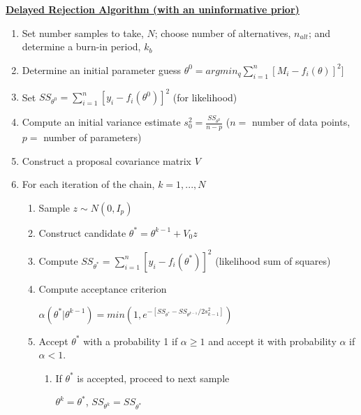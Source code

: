 \begin{tcolorbox} \label{alg:DRmcmc}
\textbf{\underline{Delayed Rejection Algorithm (with an uninformative prior)}}
\begin{enumerate}

\item Set number samples to take, $N$; choose number of alternatives, $n_{alt}$; and determine a burn-in period, $k_b$
    \item Determine an initial parameter guess $\theta^0 = argmin_q \sum_{i=1}^{n}[M_i - f_i(\theta)]^2]$
    \item Set $SS_{\theta^0} = \sum_{i = 1}^{n}[y_i - f_i(\theta^0)]^2$ (for likelihood)
    \item Compute an initial variance estimate $s_0^2 = \frac{SS_{\theta^0}}{n-p}$ ($n =$ number of data points, $p = $ number of parameters)
    \item Construct a proposal covariance matrix $V$ 
    \item For each iteration of the chain, $k = 1,...,N$
    \begin{enumerate}
        \item Sample $z \sim N(0,I_p)$ 
        \item Construct candidate $\theta^* = \theta^{k-1}+ V_0z$
        
        \item Compute $SS_{\theta^*} = \sum_{i = 1}^{n}[y_i - f_i(\theta^*)]^2$ (likelihood sum of squares)
        \item Compute acceptance criterion
            \begin{center}
                $\alpha(\theta^* | \theta^{k-1}) = min(1, e^{-[SS_{\theta^*}-SS_{\theta^{k-1}}/2s_{k-1}^2]})$
            \end{center}
        \item Accept $\theta^*$ with a probability 1 if $\alpha \geq 1$ and accept it with probability $\alpha$ if $\alpha < 1$.
        \begin{enumerate}
            \item If $\theta^*$ is accepted, proceed to next sample
            \begin{center}
                $\theta^k = \theta^*$, $SS_{\theta^k} = SS_{\theta^*}$
            \end{center}
            \begin{tcolorbox}[colback=red!5,colframe=red!75!black,title=Delayed Rejection]
        

\end{tcolorbox}
\end{enumerate}
\end{enumerate}
\end{enumerate}
\end{tcolorbox}
